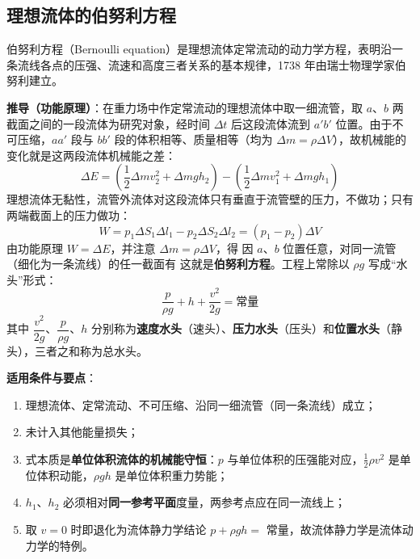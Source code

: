 
    \subsection{理想流体的伯努利方程}
    伯努利方程（Bernoulli equation）是理想流体定常流动的动力学方程，表明沿一条流线各点的压强、流速和高度三者关系的基本规律，1738 年由瑞士物理学家伯努利建立。

    \textbf{推导（功能原理）}：在重力场中作定常流动的理想流体中取一细流管，取 $a$、$b$ 两截面之间的一段流体为研究对象，经时间 $\Delta t$ 后这段流体流到 $a'b'$ 位置。由于不可压缩，$aa'$ 段与 $bb'$ 段的体积相等、质量相等（均为 $\Delta m=\rho\Delta V$），故机械能的变化就是这两段流体机械能之差：
    \[
    \Delta E=\left(\frac{1}{2}\Delta mv_{2}^{2}+\Delta mgh_{2}\right)
    -\left(\frac{1}{2}\Delta mv_{1}^{2}+\Delta mgh_{1}\right)
    \]
    理想流体无黏性，流管外流体对这段流体只有垂直于流管壁的压力，不做功；只有两端截面上的压力做功：
    \[
    W=p_{1}\Delta S_{1}\Delta l_{1}-p_{2}\Delta S_{2}\Delta l_{2}
    =(p_{1}-p_{2})\Delta V
    \]
    由功能原理 $W=\Delta E$，并注意 $\Delta m=\rho\Delta V$，得
    因 $a$、$b$ 位置任意，对同一流管（细化为一条流线）的任一截面有
    这就是\textbf{伯努利方程}。工程上常除以 $\rho g$ 写成“水头”形式：
    \[
    \frac{p}{\rho g}+h+\frac{v^{2}}{2g}=\text{常量}
    \]
    其中 $\dfrac{v^{2}}{2g}$、$\dfrac{p}{\rho g}$、$h$ 分别称为\textbf{速度水头}（速头）、\textbf{压力水头}（压头）和\textbf{位置水头}（静头），三者之和称为总水头。

    \textbf{适用条件与要点}：
    \begin{enumerate}
        \item 理想流体、定常流动、不可压缩、沿同一细流管（同一条流线）成立；
        \item 未计入其他能量损失；
        \item 式本质是\textbf{单位体积流体的机械能守恒}：$p$ 与单位体积的压强能对应，$\frac{1}{2}\rho v^{2}$ 是单位体积动能，$\rho gh$ 是单位体积重力势能；
        \item $h_{1}$、$h_{2}$ 必须相对\textbf{同一参考平面}度量，两参考点应在同一流线上；
        \item 取 $v=0$ 时即退化为流体静力学结论 $p+\rho gh=$ 常量，故流体静力学是流体动力学的特例。
    \end{enumerate}

